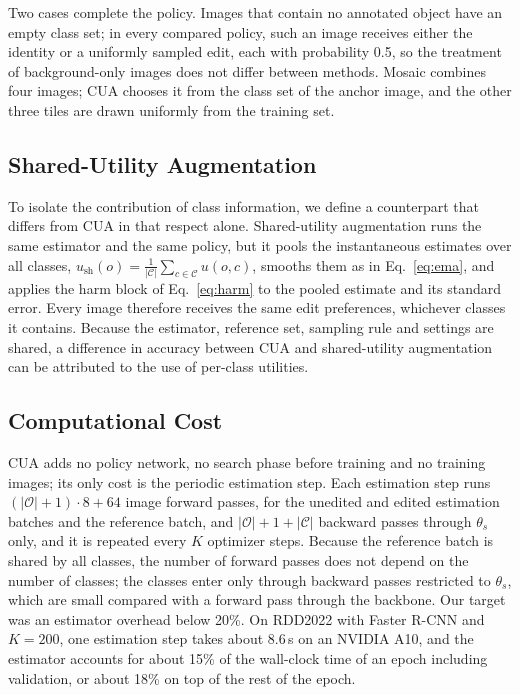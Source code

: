 \documentclass[conference]{IEEEtran}
\begin{document}
Two cases complete the policy. Images that contain no annotated object have an empty class set; in every compared policy, such an image receives either the identity or a uniformly sampled edit, each with probability 0.5, so the treatment of background-only images does not differ between methods. Mosaic combines four images; CUA chooses it from the class set of the anchor image, and the other three tiles are drawn uniformly from the training set.

\subsection{Shared-Utility Augmentation}
\label{sec:method_shared}

To isolate the contribution of class information, we define a counterpart that differs from CUA in that respect alone. Shared-utility augmentation runs the same estimator and the same policy, but it pools the instantaneous estimates over all classes, $u_{\mathrm{sh}}(o)=\frac{1}{|\mathcal{C}|}\sum_{c\in\mathcal{C}}u(o,c)$, smooths them as in Eq.~\eqref{eq:ema}, and applies the harm block of Eq.~\eqref{eq:harm} to the pooled estimate and its standard error. Every image therefore receives the same edit preferences, whichever classes it contains. Because the estimator, reference set, sampling rule and settings are shared, a difference in accuracy between CUA and shared-utility augmentation can be attributed to the use of per-class utilities.

\subsection{Computational Cost}
\label{sec:method_cost}

CUA adds no policy network, no search phase before training and no training images; its only cost is the periodic estimation step. Each estimation step runs $(|\mathcal{O}|+1)\cdot 8+64$ image forward passes, for the unedited and edited estimation batches and the reference batch, and $|\mathcal{O}|+1+|\mathcal{C}|$ backward passes through $\theta_s$ only, and it is repeated every $K$ optimizer steps. Because the reference batch is shared by all classes, the number of forward passes does not depend on the number of classes; the classes enter only through backward passes restricted to $\theta_s$, which are small compared with a forward pass through the backbone. Our target was an estimator overhead below 20\%. On RDD2022 with Faster R-CNN and $K=200$, one estimation step takes about 8.6\,s on an NVIDIA A10, and the estimator accounts for about 15\% of the wall-clock time of an epoch including validation, or about 18\% on top of the rest of the epoch.
\end{document}
